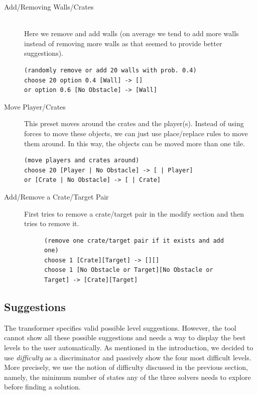 \begin{description}
    \item[Add/Removing Walls/Crates] \hfill \\
    Here we remove and add walls (on average we tend to add more walls instead of removing more walls as that seemed to provide better suggestions).
    \hfill \\
        
    \begin{lstlisting}
(randomly remove or add 20 walls with prob. 0.4)
choose 20 option 0.4 [Wall] -> []
or option 0.6 [No Obstacle] -> [Wall]
    \end{lstlisting}
        
    \item[Move Player/Crates] This preset moves around the crates and the player(s). Instead of using forces to move these objects, we can just use place/replace rules to move them around. In this way, the objects can be moved more than one tile.
    
       \begin{lstlisting}
(move players and crates around)
choose 20 [Player | No Obstacle] -> [ | Player]
or [Crate | No Obstacle] -> [ | Crate]  
    \end{lstlisting}         
    
    \item[Add/Remove a Crate/Target Pair]
    First tries to remove a crate/target pair in the modify section and then tries to remove it.

    \begin{figure}[!htbp]
    \centering
    \footnotesize
    \begin{lstlisting}
(remove one crate/target pair if it exists and add one)
choose 1 [Crate][Target] -> [][]
choose 1 [No Obstacle or Target][No Obstacle or Target] -> [Crate][Target]    
    \end{lstlisting}
    \end{figure}

\end{description}

\subsection{Suggestions} %

The transformer specifies valid possible level suggestions. However, the tool cannot show all these possible suggestions and needs a way to display the best levels to the user automatically.
As mentioned in the introduction, we decided to use \textit{difficulty} as a discriminator and passively show the four most difficult levels. More precisely, we use the notion of difficulty discussed in the previous section, namely, the minimum number of states any of the three solvers needs to explore before finding a solution.

